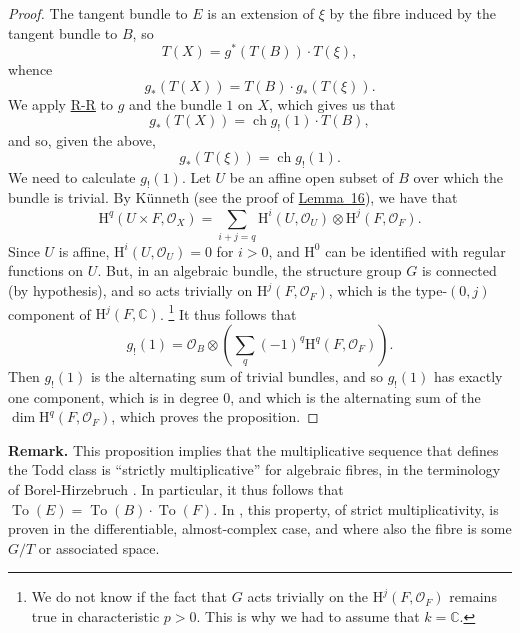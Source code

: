 \documentclass{article}
\newenvironment{rmenv}[1]
  {\phantomsection\par\medskip\noindent\textbf{#1.}\rmfamily}
  {\medskip}
\newcommand{\scr}[1]{{\mathscr{#1}}}
\newcommand{\HH}{\mathrm{H}}
\DeclareMathOperator{\ch}{ch}
\newcommand{\oldpage}[1]{\marginpar{\footnotesize$\Big\vert$ \textit{p.~#1}}}
\begin{document}
\begin{proof}
  The tangent bundle to $E$ is an extension of $\xi$ by the fibre induced by the tangent bundle to $B$, so
  \[
    T(X) = g^*(T(B))\cdot T(\xi),
  \]
  whence
  \[
    g_*(T(X)) = T(B)\cdot g_*(T(\xi)).
  \]
  We apply \hyperref[theoremriemannroch]{R-R} to $g$ and the bundle $1$ on $X$, which gives us that
  \[
    g_*(T(X)) = \ch g_!(1)\cdot T(B),
  \]
  and so, given the above,
  \[
    g_*(T(\xi)) = \ch g_!(1).
  \]
  We need to calculate $g_!(1)$.
  Let $U$ be an affine open subset of $B$ over which the bundle is trivial.
  By K\"{u}nneth (see the proof of \hyperref[lemma16]{Lemma~16}), we have that
  \[
    \HH^q(U\times F,\scr{O}_X)
    = \sum_{i+j=q} \HH^i(U,\scr{O}_U)\otimes\HH^j(F,\scr{O}_F).
  \]
  Since $U$ is affine, $\HH^i(U,\scr{O}_U)=0$ for $i>0$, and $\HH^0$ can be identified with regular functions on $U$.
  But, in an algebraic bundle, the structure group $G$ is connected (by hypothesis), and so acts trivially on $\HH^j(F,\scr{O}_F)$, which is the type-$(0,j)$ component of $\HH^j(F,\mathbb{C})$.
  \footnote{We do not know if the fact that $G$ acts trivially on the $\HH^j(F,\scr{O}_F)$ remains true in characteristic $p>0$. This is why we had to assume that $k=\mathbb{C}$.}
  It thus follows that
  \[
    g_!(1)
    = \scr{O}_B \otimes \left(
      \sum_q (-1)^q \HH^q(F,\scr{O}_F)
    \right).
  \]
  Then $g_!(1)$ is the alternating sum of trivial bundles, and so $g_!(1)$ has exactly one component, which is in degree $0$, and which is the alternating sum of the $\dim\HH^q(F,\scr{O}_F)$, which proves the proposition.
\end{proof}

\oldpage{136}
\begin{rmenv}{Remark}
  This proposition implies that the multiplicative sequence that defines the Todd class is ``strictly multiplicative'' for algebraic fibres, in the terminology of Borel-Hirzebruch \cite{2}.
  In particular, it thus follows that $\operatorname{To}(E)=\operatorname{To}(B)\cdot\operatorname{To}(F)$.
  In \cite{2}, this property, of strict multiplicativity, is proven in the differentiable, almost-complex case, and where also the fibre is some $G/T$ or associated space.
\end{rmenv}



\nocite{*}
\end{document}

